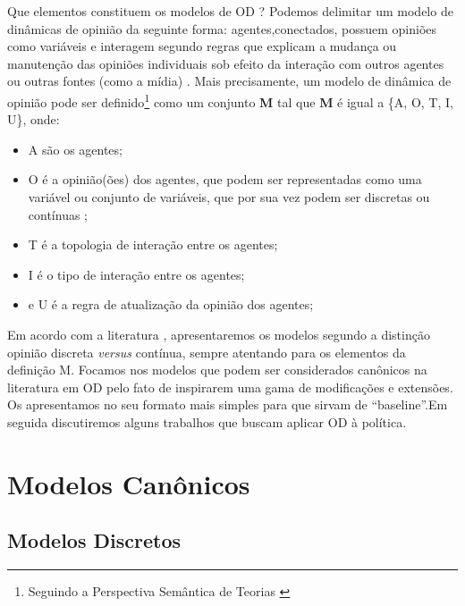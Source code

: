 Que elementos constituem os modelos de OD ? Podemos delimitar um modelo de
dinâmicas de opinião da seguinte forma: agentes,conectados, possuem opiniões
como variáveis e interagem segundo regras que explicam a mudança ou manutenção
das opiniões individuais sob efeito da interação com outros agentes ou outras
fontes (como a mídia) \cite{sirbu2017opinion}. Mais precisamente, um modelo de
dinâmica de opinião pode ser definido\footnote{Seguindo a Perspectiva Semântica
  de Teorias \cite{sep-structure-scientific-theories, troitzsch2017axiomatic}}
como um conjunto \textbf{M} tal que \textbf{M} é igual a \{A, O, T, I, U\},
onde:
\begin{itemize}
\item A são os agentes;
\item O é a opinião(ões) dos agentes, que podem ser representadas como uma
  variável ou conjunto de variáveis, que por sua vez podem ser discretas ou
  contínuas ;
\item T é a topologia de interação entre os agentes;
\item I é o tipo de interação entre os agentes;
\item e U é a regra de atualização da opinião dos agentes;
\end{itemize}

Em acordo com a literatura \cite{castellano2012social}, apresentaremos os
modelos segundo a distinção opinião discreta \textit{versus} contínua, sempre
atentando para os elementos da definição M. Focamos nos modelos que podem ser
considerados canônicos na literatura em OD pelo fato de inspirarem uma gama de
modificações e extensões. Os apresentamos no seu formato mais simples para que
sirvam de ``baseline''.Em seguida discutiremos alguns trabalhos que buscam
aplicar OD à política.

\section{Modelos Canônicos}
\subsection{Modelos Discretos}

